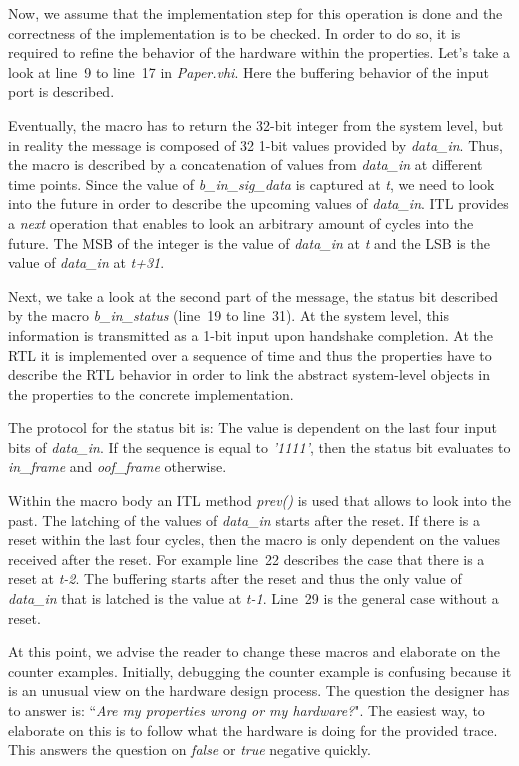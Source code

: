 Now, we assume that the implementation step for this operation is done and the correctness of the implementation is to be checked. 
In order to do so, it is required to refine the behavior of the hardware within the properties. 
Let's take a look at line~9 to line~17 in \textit{Paper.vhi}. 
Here the buffering behavior of the input port is described. 

Eventually, the macro has to return the 32-bit integer from the system level, but in reality the message is composed of 32 1-bit values provided by \textit{data\_in}. 
Thus, the macro is described by a concatenation of values from \textit{data\_in} at different time points. 
Since the value of \textit{b\_in\_sig\_data} is captured at \textit{t}, we need to look into the future in order to describe the upcoming values of \textit{data\_in}. 
ITL provides a \textit{next} operation that enables to look an arbitrary amount of cycles into the future. 
The MSB of the integer is the value of \textit{data\_in} at \textit{t} and the LSB is the value of \textit{data\_in} at \textit{t+31}.

Next, we take a look at the second part of the message, the status bit described by the macro \textit{b\_in\_status} (line~19 to line~31).
At the system level, this information is transmitted as a 1-bit input upon handshake completion.
At the RTL it is implemented over a sequence of time and thus the properties have to describe the RTL behavior in order to link the abstract system-level objects in the properties to the concrete implementation. 

The protocol for the status bit is: The value is dependent on the last four input bits of \textit{data\_in}.
If the sequence is equal to \textit{'1111'}, then the status bit evaluates to \textit{in\_frame} and \textit{oof\_frame} otherwise. 

Within the macro body an ITL method \textit{prev()} is used that allows to look into the past. 
The latching of the values of \textit{data\_in} starts after the reset. 
If there is a reset within the last four cycles, then the macro is only dependent on the values received after the reset. 
For example line~22 describes the case that there is a reset at \textit{t-2}. 
The buffering starts after the reset and thus the only value of \textit{data\_in} that is latched is the value at \textit{t-1}. 
Line~29 is the general case without a reset. 

At this point, we advise the reader to change these macros and elaborate on the counter examples. 
Initially, debugging the counter example is confusing because it is an unusual view on the hardware design process. 
The question the designer has to answer is: ``\textit{Are my properties wrong or my hardware?}".  
The easiest way, to elaborate on this is to follow what the hardware is doing for the provided trace. 
This answers the question on \textit{false} or \textit{true} negative quickly. 

